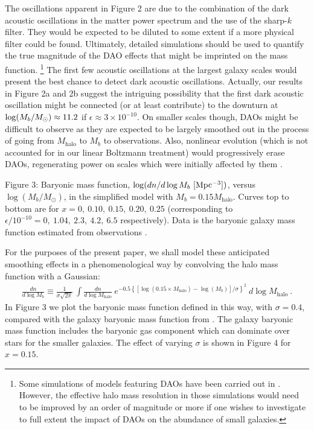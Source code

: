 \documentclass[12pt]{article}
\begin{document}
The oscillations apparent in Figure 2 are due to 
the combination of the dark acoustic oscillations in the matter power spectrum and the use of the sharp-$k$ filter. They 
would be expected to be diluted to some extent if a more physical filter could be found.
Ultimately, detailed 
simulations should be used to quantify the true magnitude of the DAO effects that might be imprinted on the mass function.
\footnote{
Some simulations of models featuring DAOs have been carried out in \cite{sigurdson4}. However, 
the effective halo mass resolution in those simulations
would need to be improved by an order of magnitude or more if one wishes to investigate to full extent the impact of DAOs on the abundance 
of small galaxies.} 
The first few acoustic oscillations at the largest galaxy scales
would present the best chance to detect dark acoustic oscillations.
Actually, our results in Figure 2a and 2b suggest the intriguing possibility that the first dark acoustic oscillation might be connected (or at least
contribute) to the downturn
at ${\rm log}(M_b/M_{\odot}) \approx 11.2$ if $\epsilon \approx 3 \times 10^{-10}$.
On smaller scales though,
DAOs might be difficult to observe as they are expected to be largely smoothed out in the 
process of going from $M_{\text{halo}}$ to $M_b$ to observations. Also, nonlinear 
evolution (which is not accounted for in our linear Boltzmann treatment) would progressively erase DAOs, regenerating power 
on scales which were initially affected by them \cite{sigurdson4}.


\vskip 0.3cm
\centerline{}
\vskip 0.29cm
\noindent
{\small Figure 3: Baryonic mass function, $\log (dn/d\log M_{b} \ [\rm Mpc^{-3}])$, versus $\log (M_{b}/M_{\odot})$, 
in the simplified model with $M_b = 0.15M_{\text{halo}}$.
Curves top to bottom are for
$x=0, \ 0.10,\ 0.15,\ 0.20,\ 0.25$ (corresponding to $\epsilon/10^{-10} = 0, \ 1.04,  \ 2.3 , \ 4.2, \ 6.5$ 
respectively). Data is the baryonic galaxy mass function estimated from observations \cite{1208}.}
\vskip 1.4cm



For the purposes of the present paper, we shall model these anticipated smoothing effects in a phenomenological way 
by convolving the halo mass function with a Gaussian:
%
\begin{eqnarray}
\frac{dn}{d \log M_b} \equiv \frac{1}{\sigma \sqrt{2\pi}} \ \int \frac{dn}{d\log M_{\text{halo}}} \ 
e^{-0.5 \left\{ [\log (0.15\times M_{\text{halo}}) - \log (M_b)]/\sigma\right\}^2} \ d \log M_{\text{halo}} \ .
\label{gauss}
\end{eqnarray}
%
In Figure 3 we plot the baryonic mass function defined in this way, with $\sigma = 0.4$, compared with 
the galaxy baryonic mass function from \cite{1208}. The galaxy baryonic mass 
function includes the baryonic gas component which 
can dominate over stars for the smaller galaxies.
The effect of varying $\sigma$ is shown in Figure 4 for $x=0.15$.
\end{document}
